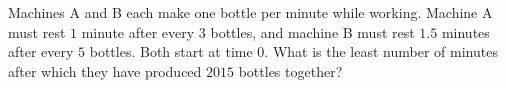 Machines A and B each make one bottle per minute while working. Machine A must rest $1$ minute after every $3$ bottles, and machine B must rest $1.5$ minutes after every $5$ bottles. Both start at time $0$. What is the least number of minutes after which they have produced $2015$ bottles together?
